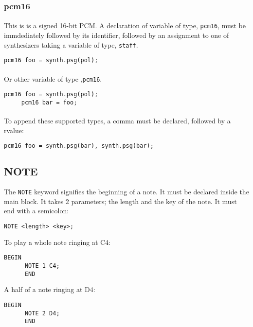 \documentclass{article}
\begin{document}
\subsubsection{pcm16}
\paragraph{} This is is a signed 16-bit PCM. A declaration of variable of type,
\verb+pcm16+, must be immdediately followed by its identifier, followed by
an assignment to one of synthesizers taking a variable of type, \verb+staff+. 
\begin{Verbatim}[frame=single]
      pcm16 foo = synth.psg(pol);
\end{Verbatim}

\paragraph{} Or other variable of type ,\verb+pcm16+.
\begin{Verbatim}[frame=single]
     pcm16 foo = synth.psg(pol);
     pcm16 bar = foo;
\end{Verbatim}

\paragraph{} To append these supported types, a comma must be declared, followed by a rvalue:
\begin{Verbatim}[frame=single]
      pcm16 foo = synth.psg(bar), synth.psg(bar);
\end{Verbatim}
\subsection{NOTE}

The \verb+NOTE+ keyword signifies the beginning of a note. It must be declared
inside the main block.
It takes 2 parameters; the length and the key of the note. It must end with
a semicolon: 
\begin{Verbatim}[frame=single]
      NOTE <length> <key>;
\end{Verbatim}

To play a whole note ringing at C4:
\begin{Verbatim}[frame=single]
      BEGIN
      NOTE 1 C4;
      END
\end{Verbatim}
\newpage
A half of a note ringing at D4:
\begin{Verbatim}[frame=single]
      BEGIN
      NOTE 2 D4;
      END
\end{Verbatim}
\end{document}
